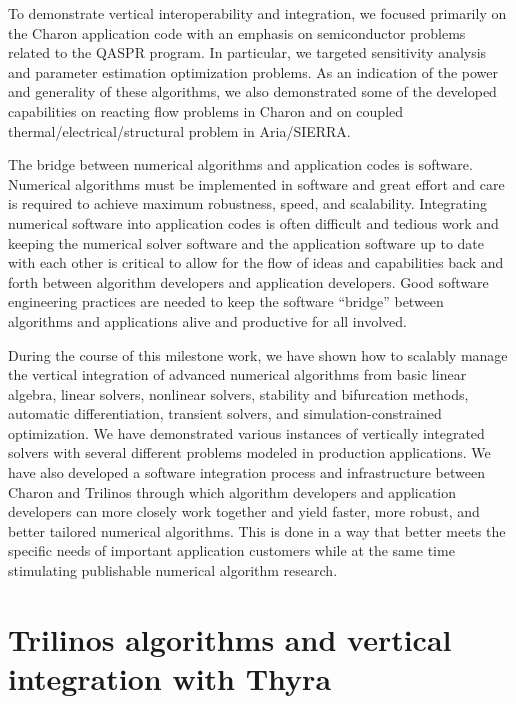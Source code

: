 \documentclass[pdf,ps2pdf,11pt]{SANDreport}
\begin{document}
To demonstrate vertical interoperability and integration, we focused primarily on
the Charon {}\cite{ref:charon} application code with an emphasis on semiconductor problems
related to the QASPR {}\cite{ref:QASPR} program.  In particular, we targeted sensitivity
analysis and parameter estimation optimization problems.  As an indication of
the power and generality of these algorithms, we also demonstrated some of the
developed capabilities on reacting flow problems in Charon and on coupled
thermal/electrical/structural problem in Aria/SIERRA.


The bridge between numerical algorithms and application codes is software.
Numerical algorithms must be implemented in software and great effort and care
is required to achieve maximum robustness, speed, and scalability.
Integrating numerical software into application codes is often difficult and
tedious work and keeping the numerical solver software and the application
software up to date with each other is critical to allow for the flow of ideas and
capabilities back and forth between algorithm developers and application
developers.  Good software engineering practices are needed to keep the
software ``bridge'' between algorithms and applications alive and productive
for all involved.

During the course of this milestone work, we have shown how to scalably manage
the vertical integration of advanced numerical algorithms from basic linear
algebra, linear solvers, nonlinear solvers, stability and bifurcation methods,
automatic differentiation, transient solvers, and simulation-constrained
optimization.  We have demonstrated various instances of vertically integrated
solvers with several different problems modeled in production applications.
We have also developed a software integration process and infrastructure
between Charon and Trilinos through which algorithm developers and application
developers can more closely work together and yield faster, more robust, and
better tailored numerical algorithms.  This is done in a way that better meets
the specific needs of important
application customers while at the same time stimulating publishable numerical
algorithm research.

%
\section{Trilinos algorithms and vertical integration with Thyra}
%
\end{document}
